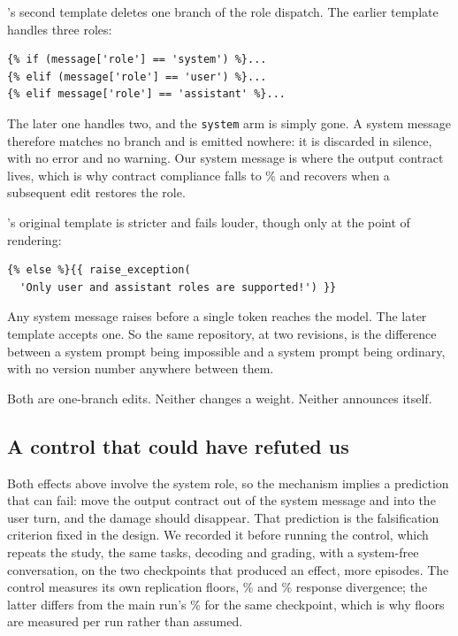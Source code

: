 \ShortPhi's second template deletes one branch of the role dispatch. The earlier template handles
three roles:

{\small\begin{verbatim}
{% if (message['role'] == 'system') %}...
{% elif (message['role'] == 'user') %}...
{% elif message['role'] == 'assistant' %}...
\end{verbatim}}

\noindent The later one handles two, and the \texttt{system} arm is simply gone. A system message
therefore matches no branch and is emitted nowhere: it is discarded in silence, with no error and no
warning. Our system message is where the output contract lives, which is why contract compliance
falls to \ConPhiB\% and recovers when a subsequent edit restores the role.

\ShortMistral's original template is stricter and fails louder, though only at the point of
rendering:

{\small\begin{verbatim}
{% else %}{{ raise_exception(
  'Only user and assistant roles are supported!') }}
\end{verbatim}}

\noindent Any system message raises before a single token reaches the model. The later template
accepts one. So the same repository, at two revisions, is the difference between a system prompt
being impossible and a system prompt being ordinary, with no version number anywhere between them.

Both are one-branch edits. Neither changes a weight. Neither announces itself.

\subsection{A control that could have refuted us}

Both effects above involve the system role, so the mechanism implies a prediction that can fail: move
the output contract out of the system message and into the user turn, and the damage should
disappear. That prediction is the falsification criterion fixed in the design. We recorded it
before running the control, which repeats the study, the same tasks, decoding and grading, with a
system-free conversation, on the two checkpoints that produced an effect, \NSFEpisodes{} more
episodes. The control measures its own replication floors, \SFFloorMistral\% and \SFFloorPhi\%
response divergence; the latter differs from the main run's \FloorPhi{}\% for the same checkpoint,
which is why floors are measured per run rather than assumed.


